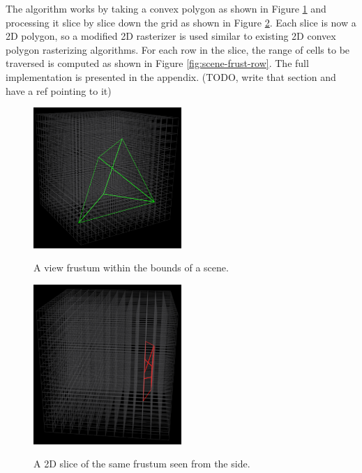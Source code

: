 \documentclass[12pt]{ucthesis}
\newcommand{\captionfonts}{\small\bf\ssp}
\begin{document}
The algorithm works by taking a convex polygon as shown in Figure \ref{fig:scene-frust} and processing it slice by slice down the grid as shown in Figure \ref{fig:scene-frust-slice}.
Each slice is now a 2D polygon, so a modified 2D rasterizer is used similar to existing 2D convex polygon rasterizing algorithms.
For each row in the slice, the range of cells to be traversed is computed as shown in Figure \ref{fig:scene-frust-row}.
The full implementation is presented in the appendix. (TODO, write that section and have a ref pointing to it)

\begin{figure}
\begin{center}
\includegraphics[width=0.5\textwidth]{Images/RasterizingAlgorithm/Final/Frust.png}
\captionfonts
\caption[A Frustum]{A view frustum within the bounds of a scene.}
\label{fig:scene-frust}
\end{center}
\end{figure}

\begin{figure}
\begin{center}
\includegraphics[width=0.5\textwidth]{Images/RasterizingAlgorithm/Final/FrustSlice.png}
\captionfonts
\caption[A Frustum Slice]{A 2D slice of the same frustum seen from the side.}
\label{fig:scene-frust-slice}
\end{center}
\end{figure}
\end{document}
